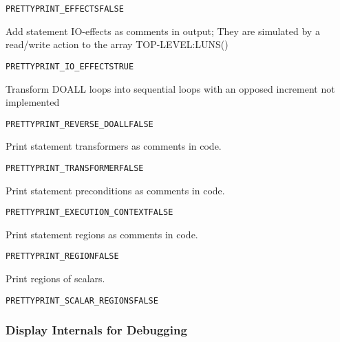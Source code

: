 \documentclass[a4paper]{report}
\newenvironment{PipsProp}{\begin{alltt}}{\end{alltt}}
\begin{document}
\begin{PipsProp}
PRETTYPRINT_EFFECTS FALSE
\end{PipsProp}

Add statement IO-effects as comments in output; They are simulated by
a read/write action to the array TOP-LEVEL:LUNS()

\begin{PipsProp}
PRETTYPRINT_IO_EFFECTS TRUE
\end{PipsProp}

Transform DOALL loops into sequential loops with an opposed increment
not implemented

\begin{PipsProp}
PRETTYPRINT_REVERSE_DOALL FALSE
\end{PipsProp}

Print statement transformers as comments in code.

\begin{PipsProp}
PRETTYPRINT_TRANSFORMER FALSE
\end{PipsProp}

Print statement preconditions as comments in code.

\begin{PipsProp}
PRETTYPRINT_EXECUTION_CONTEXT FALSE
\end{PipsProp}

Print statement regions as comments in code.

\begin{PipsProp}
PRETTYPRINT_REGION FALSE
\end{PipsProp}

Print regions of scalars.

\begin{PipsProp}
PRETTYPRINT_SCALAR_REGIONS FALSE
\end{PipsProp}


\subsubsection{Display Internals for Debugging}
\end{document}
